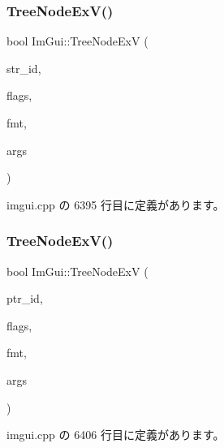 \mbox{\label{namespace_im_gui_a251cd4acbdad4cef2246d9b573a83ce0}} 
\subsubsection{\texorpdfstring{Tree\+Node\+Ex\+V()}{TreeNodeExV()}\hspace{0.1cm}{\footnotesize\ttfamily [1/2]}}
{\footnotesize\ttfamily bool Im\+Gui\+::\+Tree\+Node\+ExV (\begin{DoxyParamCaption}\item[{const char $\ast$}]{str\+\_\+id,  }\item[{\mbox{\hyperlink{imgui_8h_a0588fdd10c59b49a0159484fe9ec4564}{Im\+Gui\+Tree\+Node\+Flags}}}]{flags,  }\item[{const char $\ast$}]{fmt,  }\item[{va\+\_\+list}]{args }\end{DoxyParamCaption})}



 imgui.\+cpp の 6395 行目に定義があります。

\mbox{\label{namespace_im_gui_aaae827898572d17e064a88a1afc8e6b0}} 
\subsubsection{\texorpdfstring{Tree\+Node\+Ex\+V()}{TreeNodeExV()}\hspace{0.1cm}{\footnotesize\ttfamily [2/2]}}
{\footnotesize\ttfamily bool Im\+Gui\+::\+Tree\+Node\+ExV (\begin{DoxyParamCaption}\item[{const void $\ast$}]{ptr\+\_\+id,  }\item[{\mbox{\hyperlink{imgui_8h_a0588fdd10c59b49a0159484fe9ec4564}{Im\+Gui\+Tree\+Node\+Flags}}}]{flags,  }\item[{const char $\ast$}]{fmt,  }\item[{va\+\_\+list}]{args }\end{DoxyParamCaption})}



 imgui.\+cpp の 6406 行目に定義があります。

\mbox{\label{namespace_im_gui_a9bc1075c583973d76d8d65ea89787453}} 
